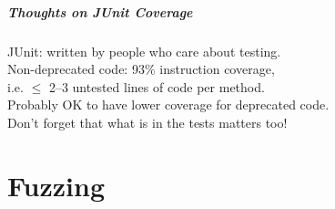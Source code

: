 \documentclass{beamer}
\newenvironment{changemargin}[1]{%
  \begin{list}{}{%
    \setlength{\topsep}{0pt}%
    \setlength{\leftmargin}{#1}%
    \setlength{\rightmargin}{1em}
    \setlength{\listparindent}{\parindent}%
    \setlength{\itemindent}{\parindent}%
    \setlength{\parsep}{\parskip}%
  }%
  \item[]}{\end{list}}
\begin{document}
\begin{frame}
  \frametitle{Thoughts on JUnit Coverage}
\begin{changemargin}{2em}
  JUnit: written by people who care about testing.\\[1em]

  Non-deprecated code: 93\% instruction coverage, \\
  \hspace*{2em} i.e. $\le$ 2--3 untested lines of code per method.\\[1em]

  Probably OK to have lower coverage for deprecated code.\\[1em]

  Don't forget that what is in the tests matters too!
\end{changemargin}
\end{frame}

\part{Fuzzing}
\begin{frame}
  \partpage
\end{frame}

  
\end{document}
